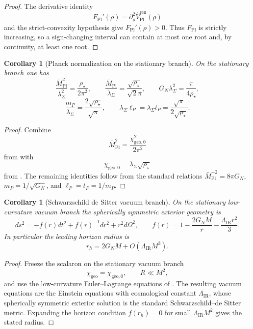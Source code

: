 \documentclass[11pt,a4paper]{article}
\newtheorem{corollary}[theorem]{Corollary}
\theoremstyle{definition}
\theoremstyle{remark}
\newcommand{\Mpl}{\bar M_{\mathrm{Pl}}}
\newcommand{\chigeo}{\chi_{\mathrm{geo}}}
\newcommand{\chigeozero}{\chi_{\mathrm{geo},0}}
\begin{document}
\begin{proof}
The derivative identity
\[
F_{\mathrm{Pl}}'(\rho)=\partial_\rho^2\widehat V_{\mathrm{Pl}}^{\mathrm{ren}}(\rho)
\]
and the strict-convexity hypothesis give $F_{\mathrm{Pl}}'(\rho)>0$. Thus $F_{\mathrm{Pl}}$ is
strictly increasing, so a sign-changing interval can contain at most one root and, by continuity, at
least one root.
\end{proof}

\begin{corollary}[Planck normalization on the stationary branch]
\label{cor:planck_normalization_stationary_branch}
On the stationary branch one has
\[
\frac{\Mpl^2}{\lambda_\Sigma^2}
=
\frac{\rho_\star}{2\pi^2},
\qquad
\frac{\Mpl}{\lambda_\Sigma}
=
\frac{\sqrt{\rho_\star}}{\sqrt2\pi},
\qquad
G_N\lambda_\Sigma^2
=
\frac{\pi}{4\rho_\star},
\]
\[
\frac{m_P}{\lambda_\Sigma}
=
\frac{2\sqrt{\rho_\star}}{\sqrt\pi},
\qquad
\lambda_\Sigma\ell_P=\lambda_\Sigma t_P
=
\frac{\sqrt\pi}{2\sqrt{\rho_\star}}.
\]
\end{corollary}

\begin{proof}
Combine
\[
\Mpl^2=\frac{\chigeozero^2}{2\pi^2}
\]
from  with
\[
\chigeozero=\lambda_\Sigma\sqrt{\rho_\star}
\]
from . The remaining identities follow from the standard
relations $\Mpl^{-2}=8\pi G_N$, $m_P=1/\sqrt{G_N}$, and $\ell_P=t_P=1/m_P$.
\end{proof}

\begin{corollary}[Schwarzschild de Sitter vacuum branch]
\label{cor:schwarzschild_de_sitter_vacuum_branch}
On the stationary low-curvature vacuum branch the spherically symmetric exterior geometry is
\[
ds^2=-f(r)dt^2+f(r)^{-1}dr^2+r^2d\Omega^2,
\qquad
f(r)=1-\frac{2G_NM}{r}-\frac{\Lambda_{\mathrm{IR}}r^2}{3}.
\]
In particular the leading horizon radius is
\[
r_h=2G_NM+O(\Lambda_{\mathrm{IR}}M^3).
\]
\end{corollary}

\begin{proof}
Freeze the scalaron on the stationary vacuum branch
\[
\chigeo=\chigeozero,
\qquad
R\ll M^2,
\]
and use the low-curvature Euler--Lagrange equations of . The
resulting vacuum equations are the Einstein equations with cosmological constant
$\Lambda_{\mathrm{IR}}$, whose spherically symmetric exterior solution is the standard
Schwarzschild--de Sitter metric. Expanding the horizon condition $f(r_h)=0$ for small
$\Lambda_{\mathrm{IR}}M^2$ gives the stated radius.
\end{proof}
\end{document}
